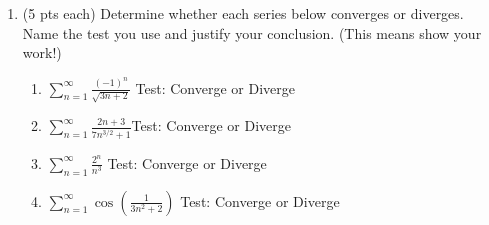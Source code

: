 \documentclass[12pt]{article}
\begin{document}
\begin{enumerate}
\newpage

\item (5 pts each) Determine whether each series below converges or diverges. Name the test you use and justify your conclusion. (This means show your work!)
	\begin{enumerate}
	\item $\displaystyle\sum_{n=1}^{\infty} \frac{(-1)^n}{\sqrt{3n+2}}$ \hfill Test: \underline{\hspace{2in}}  \hfill Converge or Diverge\\
	\vfill
	\item $\displaystyle\sum_{n=1}^{\infty} \frac{2n+3}{7n^{3/2}+1}$\hfill Test: \underline{\hspace{2in}}  \hfill Converge or Diverge\\
	
	\vfill
\newpage
	
	\item $\displaystyle\sum_{n=1}^{\infty} \frac{2^n}{n^3}$ \hfill Test: \underline{\hspace{2in}}  \hfill Converge or Diverge\\

	\vfill
	\item $\displaystyle\sum_{n=1}^{\infty} \cos\left(\frac{1}{3n^2+2}\right)$ \hfill Test: \underline{\hspace{2in}}  \hfill Converge or Diverge\\


\end{enumerate}
\end{enumerate}
\end{document}
